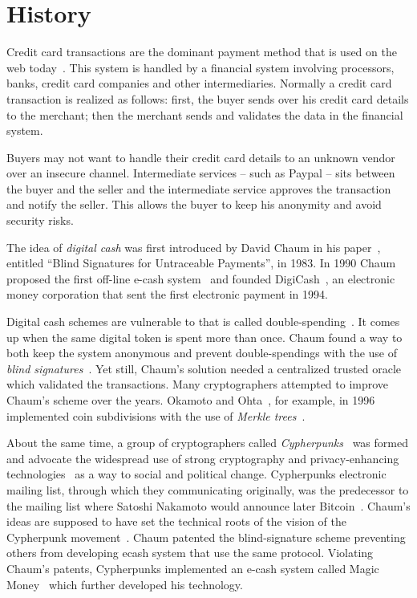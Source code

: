 \section{History}\label{blockchain:history}

Credit card transactions are the dominant payment method that is used on the web today~\cite{Narayanan:2016:BCT:2994437}. This system is handled by a financial
system involving processors, banks, credit card companies and other intermediaries. Normally a credit card transaction is realized as follows: first, the buyer sends over his credit card details to the merchant; then the merchant sends and validates the data in the financial system.

Buyers may not want to handle their credit card details to an unknown vendor over an insecure channel. Intermediate services -- such as Paypal -- sits between the buyer and the seller and the intermediate service approves
the transaction and notify the seller. This allows the buyer to keep his anonymity and avoid security risks.

The idea of \textit{digital cash} was first introduced by David Chaum in his paper~\cite{Chaum1983}, entitled ``Blind Signatures for Untraceable Payments'', in 1983. In 1990 Chaum proposed the first off-line e-cash system~\cite{Chaum:1988:UEC:646753.704915} and founded DigiCash~\cite{chaum1983blind}, an electronic money corporation that sent the first electronic payment in 1994.

Digital cash schemes are vulnerable to that is called double-spending~\cite{10.1007/978-3-662-46803-6_10, 7163021}. It comes up when the same digital token is spent more than once.  Chaum found a way to both keep the system anonymous and prevent double-spendings with the use of \textit{blind signatures}~\cite{Chaum1983,Chaum:1988:UEC:646753.704915}.
Yet still, Chaum's solution needed a centralized trusted oracle which validated the transactions. Many cryptographers attempted to improve Chaum's scheme over the years. Okamoto and Ohta~\cite{Watanabe1996}, for example, in 1996 implemented coin subdivisions with the use of \textit{Merkle trees}~\cite{merkle_tree}.

About the same time, a group of cryptographers called \textit{Cypherpunks}~\cite{cypherpunk,cypherpunks_manifesto} was formed and advocate the widespread
use of strong cryptography and privacy-enhancing technologies~\cite{cypherpunks_manifesto} as a way to social and political change. Cypherpunks electronic mailing list, through which they communicating originally, was the predecessor to the mailing list where Satoshi Nakamoto would announce later Bitcoin~\cite{nakamoto2012bitcoin}. Chaum's ideas are supposed to have set the technical roots of the vision of the Cypherpunk movement~\cite{cypherpunk}. Chaum patented the blind-signature scheme preventing others from developing ecash system that use the same protocol. Violating Chaum's patents, Cypherpunks implemented an e-cash system called Magic Money~\cite{magic_money} which further developed his technology.


